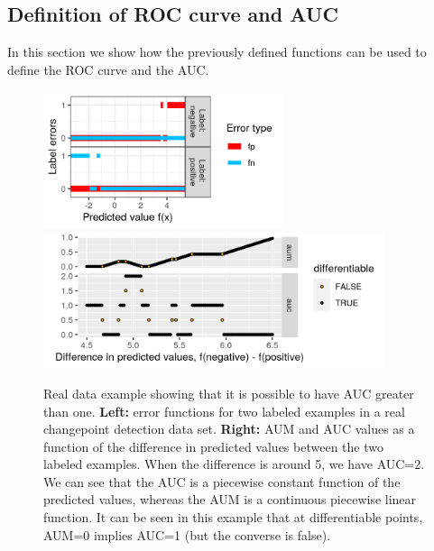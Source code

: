 \documentclass{article}
\begin{document}
\subsection{Definition of ROC curve and AUC}

In this section we show how the previously defined functions can be used to define the ROC curve and the AUC.




\begin{figure}[ht]
\vskip 0.2in
\begin{center}
\includegraphics[height=4cm]{figure-aum-convexity-profiles.png}
\includegraphics[height=4cm]{figure-aum-convexity.png}
\vskip -0.5cm
\caption{Real data example showing that it is possible to have AUC greater than one.
\textbf{Left:} error functions for two labeled examples in a real changepoint detection data set.
\textbf{Right:} AUM and AUC values as a function of the difference in predicted values between the two labeled examples.
When the difference is around 5, we have AUC=2.
We can see that the AUC is a piecewise constant function of the predicted values, whereas the AUM is a continuous piecewise linear function.
It can be seen in this example that at differentiable points, AUM=0 implies AUC=1 (but the converse is false).
}
\label{fig:aum-convexity}
\end{center}
\vskip -0.2in
\end{figure}
\end{document}

